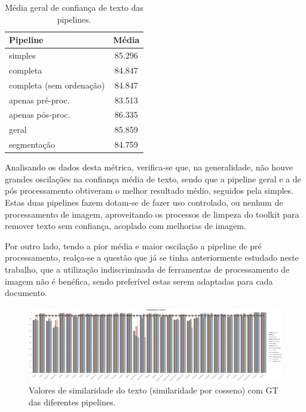 \begin{table}[H]
	\centering
	\begin{tabular}{|l|c|}
		\hline
		\textbf{Pipeline} & \textbf{Média} \\ \hline
		simples & 85.296 				   \\ \hline
		completa & 84.847 				   \\ \hline
		completa (sem ordenação) & 84.847  \\ \hline
		apenas pré-proc. & 83.513 		   \\ \hline
		apenas pós-proc. & 86.335 		   \\ \hline
		geral & 85.859 					   \\ \hline
		segmentação & 84.759 			   \\ \hline
	\end{tabular}
	\caption{Média geral de confiança de texto das pipelines.}
\end{table}


Analisando os dados desta métrica, verifica-se que, na generalidade, não houve grandes oscilações na confiança média de texto, sendo que a pipeline geral e a de pós processamento obtiveram o melhor resultado médio, seguidos pela simples. Estas duas pipelines fazem dotam-se de fazer uso controlado, ou nenhum de processamento de imagem, aproveitando os processos de limpeza do toolkit para remover texto sem confiança, acoplado com melhorias de imagem.

Por outro lado, tendo a pior média e maior oscilação a pipeline de pré processamento, realça-se a questão que já se tinha anteriormente estudado neste trabalho, que a utilização indiscriminada de ferramentas de processamento de imagem não é benéfica, sendo preferível estas serem adaptadas para cada documento. 


\begin{figure}[H]
	\centering
	\hspace*{-2cm}
	\includegraphics[width=1.2\textwidth]{images/resultados/graph_gt_similiraty_cosine.png}
	\caption{Valores de similaridade do texto (similaridade por cosseno) com GT das diferentes pipelines.}
	\label{fig:graph_gt_similiraty_cosine}
\end{figure}


